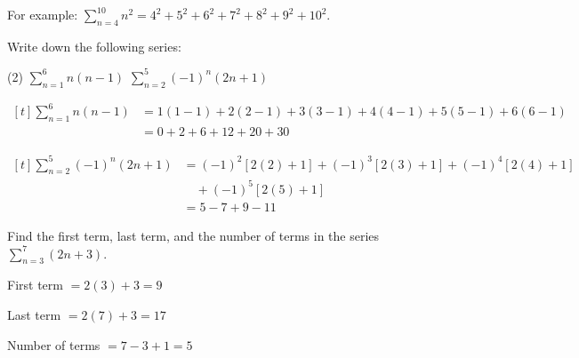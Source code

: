\documentclass{report}
\begin{document}
For example: $\displaystyle\sum_{n=4}^{10} n^{2}=4^{2}+5^{2}+6^{2}+7^{2}+8^{2}+9^{2}+10^{2}$.
\vspace{-0.5em}
\begin{question}
    Write down the following series:
    \begin{tasks}[label=(\alph*)](2)
        \task $\displaystyle\sum_{n=1}^{6} n(n-1)$
        \task $\displaystyle\sum_{n=2}^{5}(-1)^{n}(2 n+1)$
    \end{tasks}

    \sol{}
    \begin{tasks}[label=(\alph*)]
        \task $\begin{aligned}[t]
            \sum_{n=1}^{6} n(n-1)&=1(1-1)+2(2-1)+3(3-1)+4(4-1)+5(5-1)+6(6-1) \\
            &=0+2+6+12+20+30
        \end{aligned}$
        
        \task $\begin{aligned}[t]
            \sum_{n=2}^{5}(-1)^{n}(2 n+1)&=(-1)^{2}[2(2)+1]+(-1)^{3}[2(3)+1]+(-1)^{4}[2(4)+1] \\
            &\quad+(-1)^{5}[2(5)+1] \\
            &=5-7+9-11
        \end{aligned}$
    \end{tasks}
\end{question}
\vspace{-1em}
\begin{question}
    Find the first term, last term, and the number of terms in the series $\displaystyle\sum_{n=3}^{7} (2n+3)$.

    \sol{}

    \vspace{-1em}
    \noindent First term $=2(3)+3=9$

    \vspace{-1em}
    \noindent Last term $=2(7)+3=17$

    \vspace{-1em}
    \noindent Number of terms $=7-3+1=5$
\end{question}
\end{document}
